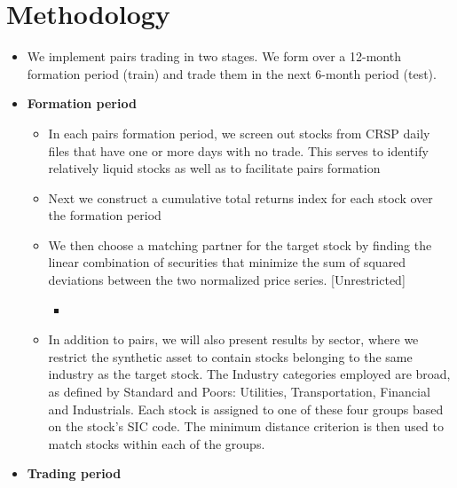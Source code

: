 \section{Methodology}

\begin{itemize}
	\item  We implement pairs trading in two stages. We form  over a 12-month formation period (train) and trade them in the next 6-month period (test). 
\blue{[Gatev et al (2006)]}
\item \textbf{Formation period}
\begin{itemize}
	\item In each pairs formation period, we screen out stocks from CRSP daily files that have one or more days with no trade. This serves to identify relatively liquid stocks as well as to facilitate pairs formation
\blue{[Gatev et al (2006)]}
	\item Next we construct a cumulative total returns index for each stock over the formation period
\blue{[Gatev et al (2006)]}
	\item We then choose a matching partner for the target stock by finding the linear combination of securities that minimize the sum of squared deviations between the two normalized price series. [Unrestricted]
	\begin{itemize}
		\item {}
	\end{itemize}
	\item In addition to  pairs, we will also present results by sector, where we restrict the synthetic asset to contain stocks belonging to the same industry as the target stock. The Industry categories employed are broad, as defined by Standard and Poors: Utilities, Transportation, Financial and Industrials. Each stock is assigned to one of these four groups based on the stock's SIC code. The minimum distance criterion is then used to match stocks within each of the groups. 
\blue{[Gatev et al (2006)]}
\end{itemize}
\item \textbf{Trading period}

\end{itemize}
